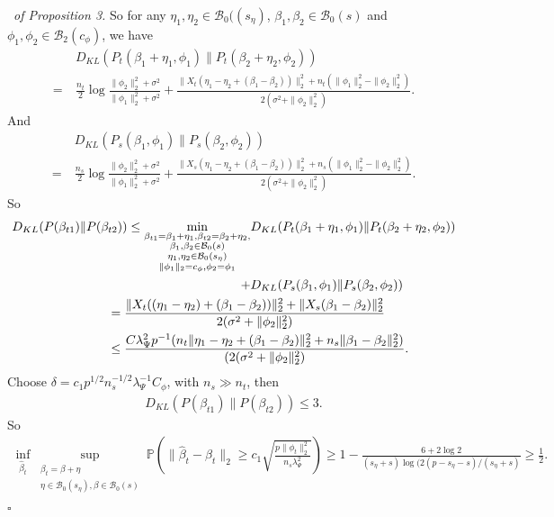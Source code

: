 \documentclass[12pt]{article}
\newenvironment{pf}{{\noindent \it Proof}\ }{\hfill $\square$\par}
\begin{document}
\begin{pf}{\it of Proposition 3. }
    So for any $\eta_1,\eta_2 \in \mathcal{B}_0((s_\eta)$, $\beta_1,\beta_2\in \mathcal{B}_0(s)$ and $\phi_1,\phi_2 \in \mathcal{B}_2(c_\phi)$, we have 
    \begin{align*}
        & D_{KL} (P_t(\beta_1+\eta_1,\phi_1)\|P_t(\beta_2+\eta_2,\phi_2)) \\= \ & 
        \frac{n_t}{2}\log \frac{\|\phi_2\|_2^2 + \sigma^2}{\|\phi_1\|_2^2 + \sigma^2} + \frac{\|X_t(\eta_1-\eta_2 + (\beta_1-\beta_2))\|_2^2 + n_t(\|\phi_1\|_2^2 - \|\phi_2\|_2^2)}{2(\sigma^2 + \|\phi_2\|_2^2)}.
    \end{align*}
    And
    \begin{align*}
        & D_{KL} (P_s(\beta_1,\phi_1)\|P_s(\beta_2,\phi_2)) \\= \ & 
        \frac{n_s}{2}\log \frac{\|\phi_2\|_2^2 + \sigma^2}{\|\phi_1\|_2^2 + \sigma^2} + \frac{\|X_s(\eta_1-\eta_2 + (\beta_1-\beta_2))\|_2^2 + n_s(\|\phi_1\|_2^2 - \|\phi_2\|_2^2)}{2(\sigma^2 + \|\phi_2\|_2^2)}.
    \end{align*}
    So
    \begin{align*}
        D_{KL}(P(\beta_{t1})\|P(\beta_{t2})) \le \underset{\substack{\beta_{t1}=\beta_1+\eta_1,\beta_{t2}=\beta_2+\eta_2,\\\beta_1,\beta_2\in \mathcal{B}_0(s)\\\eta_1,\eta_2\in \mathcal{B}_0(s_\eta)\\
        \|\phi_1\|_2=c_\phi,\phi_2=\phi_1}}{\min} & D_{KL} (P_t(\beta_1+\eta_1,\phi_1)\|P_t(\beta_2+\eta_2,\phi_2))\\ + & D_{KL} (P_s(\beta_1,\phi_1)\|P_s(\beta_2,\phi_2))\\
        &\hspace{-4cm}=  \frac{\|X_t((\eta_1-\eta_2)+(\beta_1-\beta_2))\|_2^2 + \|X_s(\beta_1-\beta_2)\|_2^2 }{2(\sigma^2 + \|\phi_2\|_2^2)}\\& \hspace{-4cm}\le
        \frac{C\lambda_\Psi^2 p^{-1} (n_t\|\eta_1-\eta_2 + (\beta_1-\beta_2)\|_2^2 + n_s\|\beta_1-\beta_2\|_2^2)}{(2(\sigma^2 + \|\phi_2\|_2^2)}.
    \end{align*}
    Choose $\delta = c_1p^{1/2} n_s^{-1/2}\lambda_\Psi^{-1}C_\phi$, with $n_s\gg n_t$, then
    \begin{align*}
        D_{KL}(P(\beta_{t1})\|P(\beta_{t2})) \le 3. 
    \end{align*}
    So
    \begin{align*}
         \inf_{\hat{\beta}_t}\underset{\substack{\beta_t=\beta+\eta\\\eta\in \mathcal{B}_0(s_\eta),\beta\in \mathcal{B}_0(s)}}{\sup}\mathbb{P}\left(\|\hat{\beta}_t-\beta_t\|_2 \ge c_1\sqrt{\frac{p\|\phi_t\|_2^2}{n_s\lambda_\Psi^2}}\right) \ge 1- \frac{6+ 2\log 2}{(s_\eta+s)\log(2(p-s_\eta-s)/(s_\eta+s)} \ge \frac{1}{2}. 

\end{align*}
\end{pf}
\end{document}
